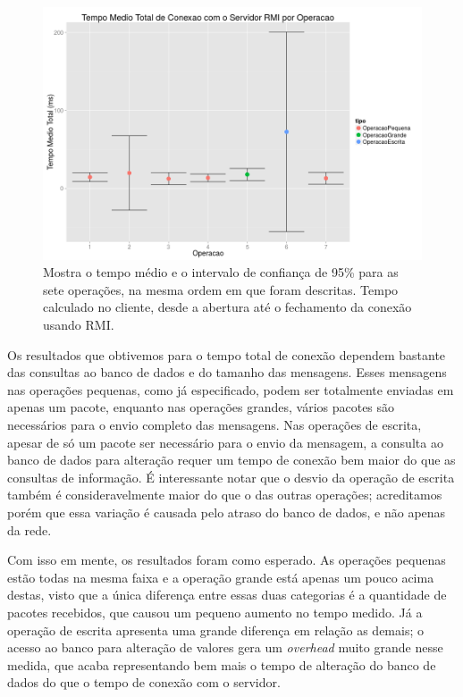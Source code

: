 \documentclass[12pt,a4paper]{article}
\begin{document}
\begin{figure}[h]
\centering
\includegraphics[width=\textwidth]{resultadosTempoTotalRMI.png}
\caption{Mostra o tempo médio e o intervalo de confiança de 95\% para as sete operações, na mesma ordem em que foram descritas. Tempo calculado no cliente, desde a abertura até o fechamento da conexão usando RMI.}
\label{fig:total}
\end{figure}

Os resultados que obtivemos para o tempo total de conexão dependem bastante das consultas ao banco de dados e do tamanho das mensagens. Esses mensagens nas operações pequenas, como já especificado, podem ser totalmente enviadas em apenas um pacote, enquanto nas operações grandes, vários pacotes são necessários para o envio completo das mensagens. Nas operações de escrita, apesar de só um pacote ser necessário para o envio da mensagem, a consulta ao banco de dados para alteração requer um tempo de conexão bem maior do que as consultas de informação. É interessante notar que o desvio da operação de escrita também é consideravelmente maior do que o das outras operações; acreditamos porém que essa variação é causada pelo atraso do banco de dados, e não apenas da rede.

Com isso em mente, os resultados foram como esperado. As operações pequenas estão todas na mesma faixa e a operação grande está apenas um pouco acima destas, visto que a única diferença entre essas duas categorias é a quantidade de pacotes recebidos, que causou um pequeno aumento no tempo medido. Já a operação de escrita apresenta uma grande diferença em relação as demais; o acesso ao banco para alteração de valores gera um {\it overhead} muito grande nesse medida, que acaba representando bem mais o tempo de alteração do banco de dados do que o tempo de conexão com o servidor.
\end{document}
